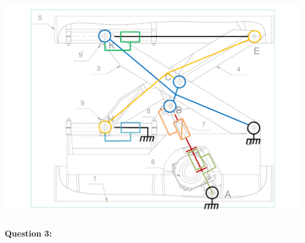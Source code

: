 \begin{center}
	\includegraphics[width=0.7\linewidth]{img/chaise_cin}
\end{center}

\paragraph{Question 3:} 

